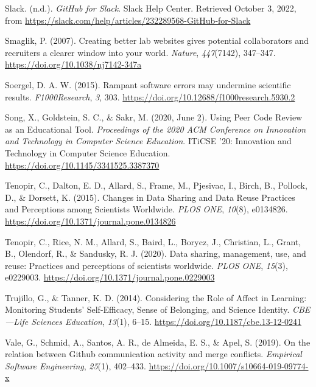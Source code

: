 \begin{CSLReferences}{1}{0}
\leavevmode{}%
Slack. (n.d.). \emph{GitHub for Slack}. Slack Help Center. Retrieved October 3, 2022, from \url{https://slack.com/help/articles/232289568-GitHub-for-Slack}

\leavevmode{}%
Smaglik, P. (2007). Creating better lab websites gives potential collaborators and recruiters a clearer window into your world. \emph{Nature}, \emph{447}(7142), 347--347. \url{https://doi.org/10.1038/nj7142-347a}

\leavevmode{}%
Soergel, D. A. W. (2015). Rampant software errors may undermine scientific results. \emph{F1000Research}, \emph{3}, 303. \url{https://doi.org/10.12688/f1000research.5930.2}

\leavevmode{}%
Song, X., Goldstein, S. C., \& Sakr, M. (2020, June 2). Using Peer Code Review as an Educational Tool. \emph{Proceedings of the 2020 ACM Conference on Innovation and Technology in Computer Science Education}. ITiCSE '20: Innovation and Technology in Computer Science Education. \url{https://doi.org/10.1145/3341525.3387370}

\leavevmode{}%
Tenopir, C., Dalton, E. D., Allard, S., Frame, M., Pjesivac, I., Birch, B., Pollock, D., \& Dorsett, K. (2015). Changes in Data Sharing and Data Reuse Practices and Perceptions among Scientists Worldwide. \emph{PLOS ONE}, \emph{10}(8), e0134826. \url{https://doi.org/10.1371/journal.pone.0134826}

\leavevmode{}%
Tenopir, C., Rice, N. M., Allard, S., Baird, L., Borycz, J., Christian, L., Grant, B., Olendorf, R., \& Sandusky, R. J. (2020). Data sharing, management, use, and reuse: Practices and perceptions of scientists worldwide. \emph{PLOS ONE}, \emph{15}(3), e0229003. \url{https://doi.org/10.1371/journal.pone.0229003}

\leavevmode{}%
Trujillo, G., \& Tanner, K. D. (2014). Considering the Role of Affect in Learning: Monitoring Students' Self-Efficacy, Sense of Belonging, and Science Identity. \emph{CBE---Life Sciences Education}, \emph{13}(1), 6--15. \url{https://doi.org/10.1187/cbe.13-12-0241}

\leavevmode{}%
Vale, G., Schmid, A., Santos, A. R., de Almeida, E. S., \& Apel, S. (2019). On the relation between Github communication activity and merge conflicts. \emph{Empirical Software Engineering}, \emph{25}(1), 402--433. \url{https://doi.org/10.1007/s10664-019-09774-x}


\end{CSLReferences}
